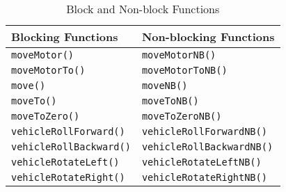 \begin{center}
    \begin{longtable}{ p{7cm}p{7cm}}
\caption{Block and Non-block Functions\label{tab:block_nonblock}}\\
\hline
Blocking Functions & Non-blocking Functions\\
\hline
\texttt{moveMotor()}            &\texttt{moveMotorNB()}\\
\texttt{moveMotorTo()}          &\texttt{moveMotorToNB()}\\
\texttt{move()}                 &\texttt{moveNB()}\\
\texttt{moveTo()}               &\texttt{moveToNB()}\\
\texttt{moveToZero()}           &\texttt{moveToZeroNB()}\\
\texttt{vehicleRollForward()}      &\texttt{vehicleRollForwardNB()}\\
\texttt{vehicleRollBackward()}     &\texttt{vehicleRollBackwardNB()}\\
\texttt{vehicleRotateLeft()}       &\texttt{vehicleRotateLeftNB()}\\
\texttt{vehicleRotateRight()}      &\texttt{vehicleRotateRightNB()}\\
\hline
\end{longtable}
\end{center}
